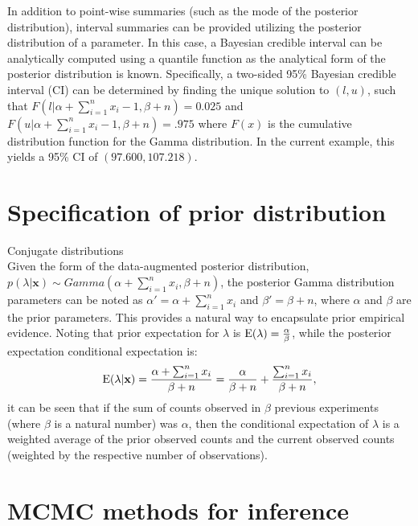 \begin{DoubleSpace*}
In addition to point-wise summaries (such as the mode of the posterior distribution), interval summaries can be provided utilizing the posterior distribution of a parameter. In this case, a Bayesian credible interval \cite{gelman2004} can be analytically computed using a quantile function as the analytical form of the posterior distribution is known. Specifically, a two-sided 95\% Bayesian credible interval (CI) can be determined by finding the unique solution to $(l,u)$, such that $F(l|\alpha+ \sum_{i=1}^n x_i -1,\beta+n)=0.025$ and $F(u|\alpha+ \sum_{i=1}^n x_i -1,\beta+n)=.975$ where $F(x)$ is the cumulative distribution function for the Gamma distribution. In the current example, this yields a 95\% CI of $(97.600, 107.218)$.
 
\section{Specification of prior distribution}
Conjugate distributions \\

Given the form of the data-augmented posterior distribution, $p(\lambda|\textbf{x})\sim Gamma(\alpha+ \sum_{i=1}^n x_i, \beta+n)$,  the posterior Gamma distribution parameters can be noted as $\alpha'=\alpha+ \sum_{i=1}^n x_i$ and $\beta'=\beta+n$, where $\alpha$ and $\beta$ are the prior parameters. This provides a natural way to encapsulate prior empirical evidence. Noting that prior expectation for $\lambda$ is $\operatorname{E}(\lambda)=\frac{\alpha}{\beta}$, while the posterior expectation conditional expectation is:
\begin{align}
	\operatorname{E}(\lambda|\textbf{x})=\frac{\alpha+ \sum_{i=1}^n x_i}{\beta+n} =\frac{\alpha}{\beta+n}+\frac{\sum_{i=1}^n x_i}{\beta+n},
\end{align} it can be seen that if the sum of counts observed in $\beta$ previous experiments (where $\beta$ is a natural number) was $\alpha$, then the conditional expectation of $\lambda$ is a weighted average of the prior observed counts and the current observed counts (weighted by the respective number of observations). 

\section{MCMC methods for inference}


\end{DoubleSpace*}
